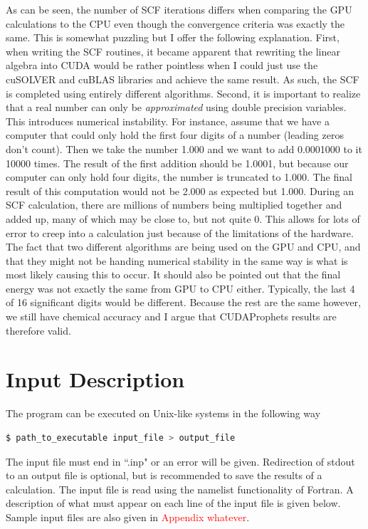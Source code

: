\documentclass[12pt]{report}
\newcommand{\notetodylan}[1]{\textcolor{red}{#1}} %
\begin{document}
As can be seen, the number of SCF iterations differs when comparing the GPU calculations to the CPU even though the convergence criteria was exactly the same. This is somewhat puzzling but I offer the following explanation. First, when writing the SCF routines, it became apparent that rewriting the linear algebra into CUDA would be rather pointless when I could just use the cuSOLVER and cuBLAS libraries and achieve the same result. As such, the SCF is completed using entirely different algorithms. Second, it is important to realize that a real number can only be \textit{approximated} using double precision variables. This introduces numerical instability. For instance, assume that we have a computer that could only hold the first four digits of a number (leading zeros don't count). Then we take the number 1.000 and we want to add 0.0001000 to it 10000 times. The result of the first addition should be 1.0001, but because our computer can only hold four digits, the number is truncated to 1.000. The final result of this computation would not be 2.000 as expected but 1.000. During an SCF calculation, there are millions of numbers being multiplied together and added up, many of which may be close to, but not quite 0. This allows for lots of error to creep into a calculation just because of the limitations of the hardware. The fact that two different algorithms are being used on the GPU and CPU, and that they might not be handing numerical stability in the same way is what is most likely causing this to occur. It should also be pointed out that the final energy was not exactly the same from GPU to CPU either. Typically, the last 4 of 16 significant digits would be different. Because the rest are the same however, we still have chemical accuracy and I argue that CUDAProphets results are therefore valid.


\section{Input Description}\label{inp_des}
The program can be executed on Unix-like systems in the following way
\begin{lstlisting}[language=bash]
	$ path_to_executable input_file > output_file
\end{lstlisting}

The input file must end in ``.inp" or an error will be given. Redirection of stdout to an output file is optional, but is recommended to save the results of a calculation. The input file is read using the namelist functionality of Fortran. A description of what must appear on each line of the input file is given below. Sample input files are also given in \notetodylan{Appendix whatever}.
\end{document}
